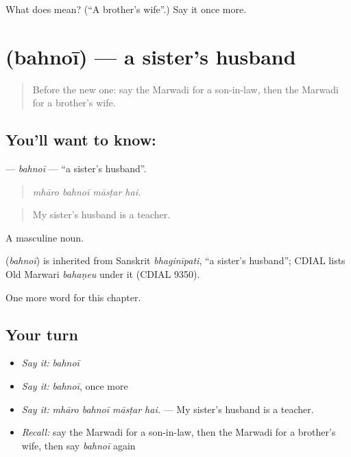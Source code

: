 \begin{tcolorbox}[breakable,colback=teal!4,colframe=teal!35!black,title={Before you move on}]
What does  mean? (\textquotedblleft{}A brother's wife\textquotedblright{}.) Say it once more.
\end{tcolorbox}
\section[\texorpdfstring{\mw{बहनोई} (bahnoī)}{बहनोई (bahnoī)}]{ (bahnoī) — a sister's husband}

\label{lesson:MW-C260-bahnoi}



\begin{quote}
Before the new one: say the Marwadi for a son-in-law, then the Marwadi for a brother's wife.
\end{quote}

\subsection*{You'll want to know: }
\textbf{} — \emph{bahnoī} — \textquotedblleft{}a sister's husband\textquotedblright{}.

\begin{quote}
   
\end{quote}

\begin{quote}
\emph{mhāro bahnoī māsṭar hai.}
\end{quote}

\begin{quote}
My sister's husband is a teacher.
\end{quote}

A masculine noun.

\begin{cousinweb}
\textbf{} (\emph{bahnoī}) is inherited from Sanskrit \emph{bhaginīpati}, \textquotedblleft{}a sister's husband\textquotedblright{}; CDIAL lists Old Marwari \emph{bahaṇeu} under it (CDIAL 9350).
\end{cousinweb}

\begin{grammarlens}[title={What you've built}]
One more word for this chapter.
\end{grammarlens}

\subsection*{Your turn}
\begin{itemize}
\raggedright
  \item \emph{Say it:} \emph{bahnoī}
  \item \emph{Say it:} \emph{bahnoī}, once more
  \item \emph{Say it:} \emph{mhāro bahnoī māsṭar hai.} — My sister's husband is a teacher.
  \item \emph{Recall:} say the Marwadi for a son-in-law, then the Marwadi for a brother's wife, then say \emph{bahnoī} again
\end{itemize}

